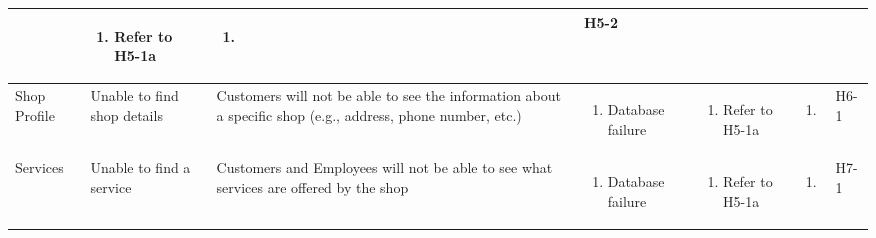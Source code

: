 \documentclass{article}
\begin{document}
\begin{landscape}
\begin{table}[H]
\begin{adjustbox}{width=\paperwidth}
\begin{tabular}{|p{}|p{}|p{}|p{}|p{}|p{}|p{}|}
				 & \begin{enumerate}[label=\alph*., leftmargin=*]
					   \item Refer to H5-1a
				   \end{enumerate}
				 & \begin{enumerate}[label=\alph*., leftmargin=*]
					   \item
				   \end{enumerate}
				 & H5-2                                                                                                        \\
				\hline
				Shop Profile
				 & Unable to find shop details
				 & Customers will not be able to see the information about a specific shop (e.g., address, phone number, etc.)
				 & \begin{enumerate}[label=\alph*., leftmargin=*]
					   \item Database failure
				   \end{enumerate}
				 & \begin{enumerate}[label=\alph*., leftmargin=*]
					   \item Refer to H5-1a
				   \end{enumerate}
				 & \begin{enumerate}[label=\alph*., leftmargin=*]
					   \item
				   \end{enumerate}
				 & H6-1                                                                                                        \\
				\hline
				\multirow{2}{*}{Services}
				 & Unable to find a service
				 & Customers and Employees will not be able to see what services are offered by the shop
				 & \begin{enumerate}[label=\alph*., leftmargin=*]
					   \item Database failure
				   \end{enumerate}
				 & \begin{enumerate}[label=\alph*., leftmargin=*]
					   \item Refer to H5-1a
				   \end{enumerate}
				 & \begin{enumerate}[label=\alph*., leftmargin=*]
					   \item
				   \end{enumerate}
				 & H7-1                                                                                                        \\
				\cline{2-7}

\end{tabular}
\end{adjustbox}
\end{table}
\end{landscape}
\end{document}
